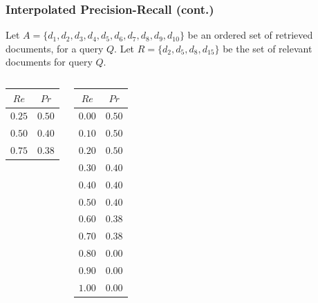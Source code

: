 \documentclass[svgnames]{beamer}
\begin{document}

\begin{frame}
  \frametitle{Interpolated Precision-Recall (cont.)}
  
    Let $A = \{d_1, d_2, d_3, d_4, d_5, d_6, d_7, d_8, d_9, d_{10}\}$ be an
    ordered set of retrieved documents, for a query $Q$. Let $R = \{d_2, d_5,
    d_8, d_{15}\}$ be the set of relevant documents for query $Q$.
    
    \vspace{-4ex}

    \begin{columns}

      \begin{center}
          \small
          \begin{tabular}{c|c}
            $Re$ & $Pr$ \\\hline
            $0.25$ & $0.50$ \\
            $0.50$ & $0.40$ \\
            $0.75$ & $0.38$ \\
          \end{tabular}
      \end{center}


      \begin{center}
        \begin{tabular}{c|c}
          $Re$ & $Pr$ \\\hline
          $0.00$ & $0.50$ \\
          $0.10$ & $0.50$ \\
          $0.20$ & $0.50$ \\
          $0.30$ & $0.40$ \\
          $0.40$ & $0.40$ \\
          $0.50$ & $0.40$ \\
          $0.60$ & $0.38$ \\
          $0.70$ & $0.38$ \\
          $0.80$ & $0.00$ \\
          $0.90$ & $0.00$ \\
          $1.00$ & $0.00$
        \end{tabular}
      \end{center}

 

\end{columns}
\end{frame}
\end{document}
